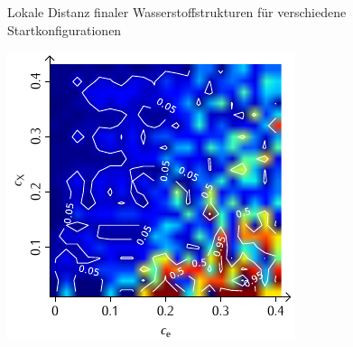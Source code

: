 \documentclass[a4paper, 10pt, twoside, openany]{book} %
\begin{document}
\begin{figure}
\begin{minipage}[t]{0.48\textwidth}
        \label{H_penalty_individual_D}
    \end{minipage}
    \caption[Lokale Distanz finaler Wasserstoffstrukturen]{Lokale Distanz finaler Wasserstoffstrukturen für verschiedene Startkonfigurationen}
    \label{H_D}
\end{figure}

\begin{figure}
    \begin{minipage}[t]{0.48\textwidth}
        \includegraphics[width=\textwidth]{Abbildungen/Phasendiagramme/Konturen/H_cluster_P.pdf}
        \label{H_cluster_P}
    \end{minipage}
    \hfill
    \begin{minipage}[t]{0.48\textwidth}

\end{minipage}
\end{figure}
\end{document}
